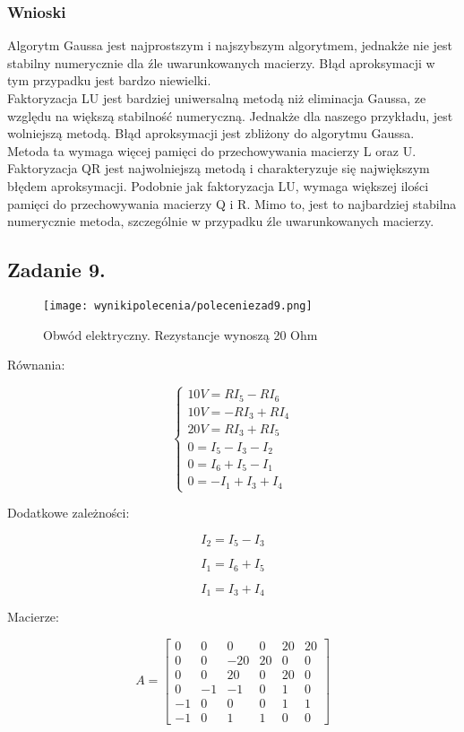 \documentclass{article}
\begin{document}
\subsubsection{Wnioski}
Algorytm Gaussa jest najprostszym i najszybszym algorytmem, jednakże nie jest stabilny numerycznie dla źle uwarunkowanych macierzy. Błąd aproksymacji w tym przypadku jest bardzo niewielki.\\
Faktoryzacja LU jest bardziej uniwersalną metodą niż eliminacja Gaussa, ze względu na większą stabilność numeryczną. Jednakże dla naszego przykładu, jest wolniejszą metodą. Błąd aproksymacji jest zbliżony do algorytmu Gaussa. Metoda ta wymaga więcej pamięci do przechowywania macierzy L oraz U. \\
Faktoryzacja QR jest najwolniejszą metodą i charakteryzuje się największym błędem aproksymacji. Podobnie jak faktoryzacja LU, wymaga większej ilości pamięci do przechowywania macierzy Q i R. Mimo to, jest to najbardziej stabilna numerycznie metoda, szczególnie w przypadku źle uwarunkowanych macierzy.


\subsection{Zadanie 9.}
\begin{figure}[h]
    \centering
    \texttt{[image: wynikipolecenia/poleceniezad9.png]}
    \caption{Obwód elektryczny. Rezystancje wynoszą 20 Ohm}
    \label{zad9polecenie}
\end{figure}
Równania:

\[
\begin{cases}
10V = R I_5 - R I_6 \\
10V = -R I_3 + R I_4 \\
20V = R I_3 + R I_5 \\
0 = I_5 - I_3 - I_2 \\
0 = I_6 + I_5 - I_1 \\
0 = -I_1 + I_3 + I_4
\end{cases}
\]

Dodatkowe zależności:

\[
I_2 = I_5 - I_3
\]

\[
I_1 = I_6 + I_5
\]

\[
I_1 = I_3 + I_4
\]

Macierze:

\[
A =
\begin{bmatrix}
0 & 0 & 0 & 0 & 20 & 20 \\
0 & 0 & -20 & 20 & 0 & 0 \\
0 & 0 & 20 & 0 & 20 & 0 \\
0 & -1 & -1 & 0 & 1 & 0 \\
-1 & 0 & 0 & 0 & 1 & 1 \\
-1 & 0 & 1 & 1 & 0 & 0
\end{bmatrix}
\]
\end{document}
